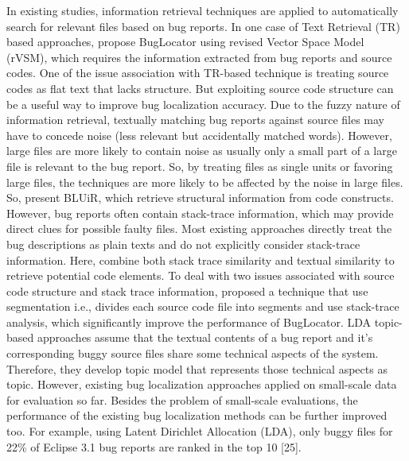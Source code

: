\documentclass{sig-alternate}
\begin{document}
In existing studies, information retrieval techniques  \cite{Jian} \cite{Saha} \cite{Moreno} \cite{Anh} \cite{Lukins} are applied to automatically search for relevant files based on bug reports.
In one case of Text Retrieval (TR) based approaches, \citet{Jian} propose BugLocator using revised Vector Space Model (rVSM), which requires the information extracted from bug reports and source codes. One of the issue association with TR-based technique is treating source codes as flat text that lacks structure. But exploiting source code structure can be a useful way to improve bug localization accuracy.
Due to the fuzzy nature of information retrieval, textually matching bug reports against source
files may have to concede noise (less relevant but accidentally matched words). However, large files are more
likely to contain noise as usually only a small part
of a large file is relevant to the bug report. So, by treating
files as single units or favoring large files, the techniques are more
likely to be affected by the noise in large files. So, \citet{Saha} present BLUiR, which retrieve structural information from code constructs.
However, bug reports often contain stack-trace information, which may provide direct clues for possible faulty files. Most existing approaches directly treat the bug descriptions as plain texts and do not explicitly consider stack-trace information. Here, \citet{Moreno} combine both stack trace similarity and textual similarity to retrieve potential code elements. 
To deal with two issues associated with source code structure and stack trace information, 
\citet{Chu}  proposed  a technique that use segmentation i.e., divides each source code file into segments and use stack-trace analysis, which significantly improve the performance of BugLocator.
LDA topic-based approaches \cite{Anh} \cite{Lukins} assume that the textual contents of a bug report and it's corresponding buggy source files share some technical aspects of the system.
Therefore, they develop topic model that represents those technical aspects as topic. 
However, existing bug localization approaches applied on small-scale data for evaluation so far.
Besides the problem of small-scale evaluations, the performance of the existing bug localization methods can be further improved too. For example, using Latent Dirichlet Allocation (LDA), only buggy files for 22\% of Eclipse 3.1 bug reports are ranked in the top 10 [25]. 
\end{document}
